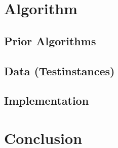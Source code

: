 \documentclass [12pt]{article}
\begin{document}
\section{Algorithm}
    \subsection{Prior Algorithms}
    \subsection{Data (Testinstances)}
    \subsection{Implementation}
\section{Conclusion}



\end{document}
